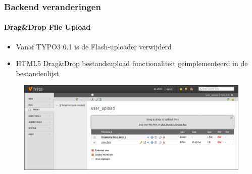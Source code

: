 
\begin{frame}[fragile]
	\frametitle{Backend veranderingen}
	\framesubtitle{Drag\&Drop File Upload}

	\begin{itemize}
		\item Vanaf TYPO3 6.1 is de Flash-uploader verwijderd
		\item HTML5 Drag\&Drop bestandsupload functionaliteit geimplementeerd in de bestandenlijst

	\end{itemize}

	\begin{figure}
		\includegraphics[width=0.95\linewidth]{Images/BackendChanges/DragDropFileUpload.png}
	\end{figure}

\end{frame}

%
%
%
%
%

